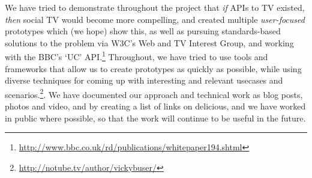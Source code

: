 \documentclass{notube}
\begin{document}
We have tried to demonstrate throughout the project that \emph{if} APIs to TV existed, \emph{then} social TV would become more compelling, and created multiple \emph{user-focused} prototypes which (we hope) show this, as well as pursuing standards-based solutions to the problem via W3C's Web and TV Interest Group, and working with the BBC's `UC' API.\footnote{\url{http://www.bbc.co.uk/rd/publications/whitepaper194.shtml}} Throughout, we have tried to use tools and frameworks that allow us to create prototypes as quickly as possible, while using diverse techniques for coming up with interesting and relevant usecases and scenarios.\footnote{\url{http://notube.tv/author/vickybuser/}}. We have documented our approach and technical work as blog posts, photos and video, and by creating a list of links on delicious, and we have worked in public where possible, so that the work will continue to be useful in the future.
\end{document}
